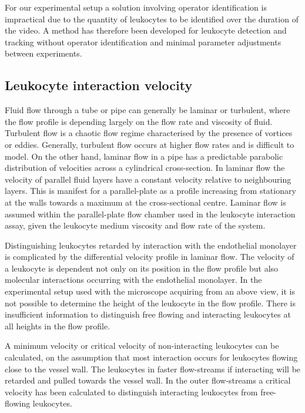 For our experimental setup a solution involving operator identification is impractical due to the quantity of leukocytes to be identified over the duration of the video. A method has therefore been developed for leukocyte detection and tracking without operator identification and minimal parameter adjustments between experiments.

\subsection{Leukocyte interaction velocity}
\label{leukocytes:introduction:velocity}
Fluid flow through a tube or pipe can generally be laminar or turbulent, where the flow profile is depending largely on the flow rate and viscosity of fluid. Turbulent flow is a chaotic flow regime characterised by the presence of vortices or eddies. Generally, turbulent flow occurs at higher flow rates and is difficult to model. On the other hand, laminar flow in a pipe has a predictable parabolic distribution of velocities across a cylindrical cross-section. In laminar flow the velocity of parallel fluid layers have a constant velocity relative to neighbouring layers. This is manifest for a parallel-plate as a profile increasing from stationary at the walls towards a maximum at the cross-sectional centre. Laminar flow is assumed within the parallel-plate flow chamber used in the leukocyte interaction assay, given the leukocyte medium viscosity and flow rate of the system.

Distinguishing leukocytes retarded by interaction with the endothelial monolayer is complicated by the differential velocity profile in laminar flow. The velocity of a leukocyte is dependent not only on its position in the flow profile but also molecular interactions occurring with the endothelial monolayer. In the experimental setup used with the microscope acquiring from an above view, it is not possible to determine the height of the leukocyte in the flow profile. There is insufficient information to distinguish free flowing and interacting leukocytes at all heights in the flow profile. 

A minimum velocity or critical velocity of non-interacting leukocytes can be calculated, on the assumption that most interaction occurs for leukocytes flowing close to the vessel wall. The leukocytes in faster flow-streams if interacting will be retarded and pulled towards the vessel wall. In the outer flow-streams a critical velocity has been calculated to distinguish interacting leukocytes from free-flowing leukocytes.

